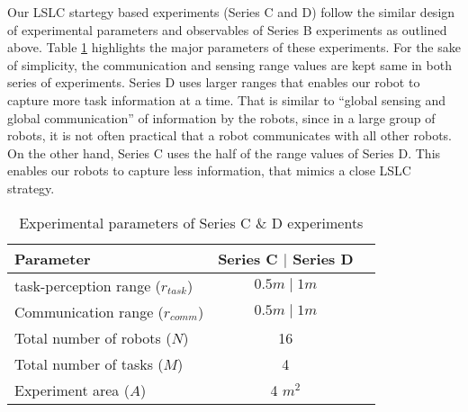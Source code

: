 \documentclass[journal]{IEEEtran}
\begin{document}
Our LSLC startegy based experiments (Series C and D) follow the similar design of experimental parameters and observables of Series B experiments as outlined above. Table \ref{table:local-expt-design} highlights the major parameters of these experiments. For the sake of simplicity, the communication and sensing range values are kept same in both series of experiments.
Series D uses larger ranges that enables our robot to capture more task information at a time. That is similar to  ``global sensing and global communication'' of information by the robots, since in a large group of robots, it is not often practical that a robot communicates with all other robots. On the other hand, Series C uses the half of the range values of Series D. This enables our robots to capture less information, that mimics a close LSLC strategy. 
\begin{table}
\caption{Experimental parameters of Series C \& D experiments}
\label{table:local-expt-design}
\begin{center}
\begin{tabular}{|l|c|c|}
\hline Parameter & \hspace*{0.2cm} Series C $\mid$ Series D\\
\hline task-perception range ($r_{task}$) & $0.5 m \mid 1 m$\\
\hline Communication range ($r_{comm}$) & $0.5 m \mid 1 m$\\
\hline Total number of robots ($N$) & 16 \\
\hline Total number of tasks ($M$) & 4 \\
\hline Experiment area ($A$) & 4 $m^2$\\
\hline
\end{tabular}
\end{center}
\end{table}

\end{document}
